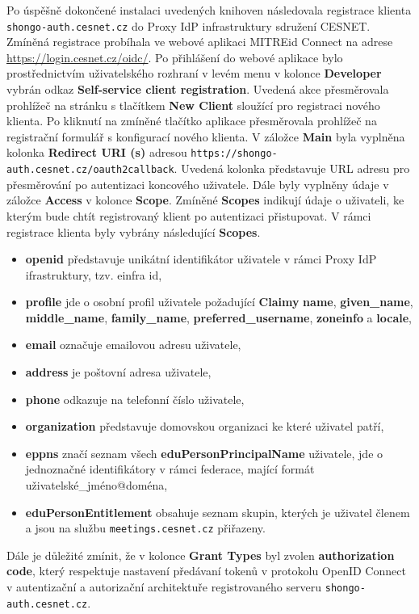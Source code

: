 \documentclass[
  printed, %
  twoside, %
  table,   %
  nolof,     %
  nolot,     %
]{fithesis3}
\begin{document}
Po úspěšně dokončené instalaci uvedených knihoven následovala registrace klienta \texttt{shongo-auth.cesnet.cz} do Proxy IdP infrastruktury sdružení CESNET. Zmíněná registrace probíhala ve webové aplikaci MITREid Connect na adrese \url{https://login.cesnet.cz/oidc/}. Po přihlášení do webové aplikace bylo prostřednictvím uživatelského rozhraní v levém menu v kolonce \textbf{Developer} vybrán odkaz \textbf{Self-service client registration}. Uvedená akce přesměrovala prohlížeč na stránku s tlačítkem \textbf{New Client} sloužící pro registraci nového klienta. Po kliknutí na zmíněné tlačítko aplikace přesměrovala prohlížeč na registrační formulář s konfigurací nového klienta. V záložce \textbf{Main} byla vyplněna kolonka \textbf{Redirect URI (s)} adresou \texttt{https://shongo-auth.cesnet.cz/oauth2callback}. Uvedená kolonka představuje URL adresu pro přesměrování po autentizaci koncového uživatele. Dále byly vyplněny údaje v záložce \textbf{Access} v kolonce \textbf{Scope}. Zmíněné \textbf{Scopes} indikují údaje o uživateli, ke kterým bude chtít registrovaný klient po autentizaci přistupovat. V rámci registrace klienta byly vybrány následující \textbf{Scopes}.
\begin{itemize}
    \item \textbf{openid} představuje unikátní identifikátor uživatele v rámci Proxy IdP ifrastruktury, tzv. einfra id,
    \item \textbf{profile} jde o osobní profil uživatele požadující \textbf{Claimy} \textbf{name}, \textbf{given\_name}, \textbf{middle\_name}, \textbf{family\_name}, \textbf{preferred\_username}, \textbf{zoneinfo} a \textbf{locale},
    \item \textbf{email} označuje emailovou adresu uživatele,
    \item \textbf{address} je poštovní adresa uživatele,
    \item \textbf{phone} odkazuje na telefonní číslo uživatele,
    
    \item \textbf{organization} představuje domovskou organizaci ke které uživatel patří,
    \item \textbf{eppns} značí seznam všech \textbf{eduPersonPrincipalName} uživatele, jde o jednoznačné identifikátory v rámci federace, mající formát uživatelské\_jméno@doména,  
    \item \textbf{eduPersonEntitlement} obsahuje seznam skupin, kterých je uživatel členem a jsou na službu \texttt{meetings.cesnet.cz} přiřazeny.
    
\end{itemize}
Dále je důležité zmínit, že v kolonce \textbf{Grant Types} byl zvolen \textbf{authorization code}, který respektuje nastavení předávaní tokenů v protokolu OpenID Connect v autentizační a autorizační architektuře registrovaného serveru \texttt{shongo-auth.cesnet.cz}.  \par
\end{document}
